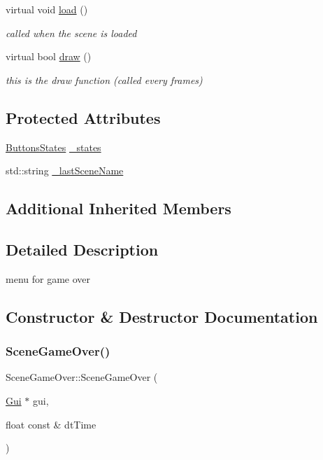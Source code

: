 \begin{DoxyCompactItemize}
\mbox{\label{class_scene_game_over_a5bc6590f384939e216265d19597760f6}} 
virtual void \hyperlink{class_scene_game_over_a5bc6590f384939e216265d19597760f6}{load} ()
\begin{DoxyCompactList}\small\item\em called when the scene is loaded \end{DoxyCompactList}\item 
virtual bool \hyperlink{class_scene_game_over_aa9c4f9d3cabdc89176c0113e2864f3e8}{draw} ()
\begin{DoxyCompactList}\small\item\em this is the draw function (called every frames) \end{DoxyCompactList}\end{DoxyCompactItemize}
\subsection*{Protected Attributes}
\begin{DoxyCompactItemize}
\item 
\hyperlink{struct_scene_game_over_1_1_buttons_states}{Buttons\+States} \hyperlink{class_scene_game_over_a59d3b330db3d8eafcd8b1d1a2b44a845}{\+\_\+states}
\item 
std\+::string \hyperlink{class_scene_game_over_abf015c1667f14f83adcd22f5ccdbb360}{\+\_\+last\+Scene\+Name}
\end{DoxyCompactItemize}
\subsection*{Additional Inherited Members}


\subsection{Detailed Description}
menu for game over 

\subsection{Constructor \& Destructor Documentation}
\mbox{\label{class_scene_game_over_a450e4074509d54e63d26b87920e96e61}} 
\subsubsection{\texorpdfstring{Scene\+Game\+Over()}{SceneGameOver()}\hspace{0.1cm}{\footnotesize\ttfamily [1/2]}}
{\footnotesize\ttfamily Scene\+Game\+Over\+::\+Scene\+Game\+Over (\begin{DoxyParamCaption}\item[{\hyperlink{class_gui}{Gui} $\ast$}]{gui,  }\item[{float const \&}]{dt\+Time }\end{DoxyParamCaption})}



